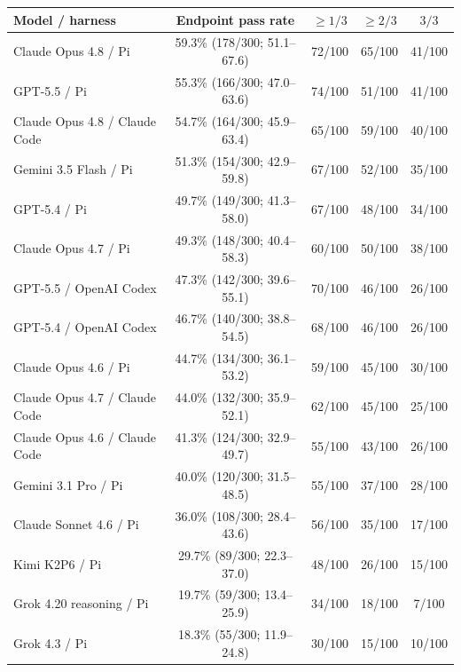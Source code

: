 \documentclass[10pt,letterpaper]{article}
\begin{document}
\begin{center}
    \begin{minipage}{0.96\textwidth}
    \centering
    \fontsize{8.1}{9.3}\selectfont
    \setlength{\tabcolsep}{3.8pt}
    \renewcommand{\arraystretch}{0.9}
    \begin{tabular}{@{}lcccc@{}}
    \toprule
    Model / harness & Endpoint pass rate & $\geq 1/3$ & $\geq 2/3$ & $3/3$ \\
    \midrule
    Claude Opus 4.8 / Pi & 59.3\% (178/300; 51.1--67.6) & 72/100 & 65/100 & 41/100 \\
    GPT-5.5 / Pi & 55.3\% (166/300; 47.0--63.6) & 74/100 & 51/100 & 41/100 \\
    Claude Opus 4.8 / Claude Code & 54.7\% (164/300; 45.9--63.4) & 65/100 & 59/100 & 40/100 \\
    Gemini 3.5 Flash / Pi & 51.3\% (154/300; 42.9--59.8) & 67/100 & 52/100 & 35/100 \\
    GPT-5.4 / Pi & 49.7\% (149/300; 41.3--58.0) & 67/100 & 48/100 & 34/100 \\
    Claude Opus 4.7 / Pi & 49.3\% (148/300; 40.4--58.3) & 60/100 & 50/100 & 38/100 \\
    GPT-5.5 / OpenAI Codex & 47.3\% (142/300; 39.6--55.1) & 70/100 & 46/100 & 26/100 \\
    GPT-5.4 / OpenAI Codex & 46.7\% (140/300; 38.8--54.5) & 68/100 & 46/100 & 26/100 \\
    Claude Opus 4.6 / Pi & 44.7\% (134/300; 36.1--53.2) & 59/100 & 45/100 & 30/100 \\
    Claude Opus 4.7 / Claude Code & 44.0\% (132/300; 35.9--52.1) & 62/100 & 45/100 & 25/100 \\
    Claude Opus 4.6 / Claude Code & 41.3\% (124/300; 32.9--49.7) & 55/100 & 43/100 & 26/100 \\
    Gemini 3.1 Pro / Pi & 40.0\% (120/300; 31.5--48.5) & 55/100 & 37/100 & 28/100 \\
    Claude Sonnet 4.6 / Pi & 36.0\% (108/300; 28.4--43.6) & 56/100 & 35/100 & 17/100 \\
    Kimi K2P6 / Pi & 29.7\% (89/300; 22.3--37.0) & 48/100 & 26/100 & 15/100 \\
    Grok 4.20 reasoning / Pi & 19.7\% (59/300; 13.4--25.9) & 34/100 & 18/100 & 7/100 \\
    Grok 4.3 / Pi & 18.3\% (55/300; 11.9--24.8) & 30/100 & 15/100 & 10/100 \\
    \bottomrule
    \end{tabular}
    \label{tab:passrates}
    \end{minipage}
\end{center}
\end{document}
